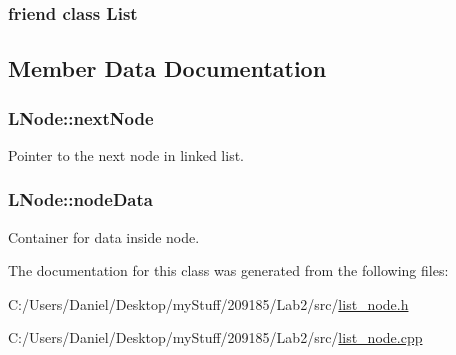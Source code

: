 \subsubsection[{List}]{\setlength{\rightskip}{0pt plus 5cm}friend class {\bf List}\hspace{0.3cm}{\ttfamily [friend]}}\label{class_l_node_a8cee552d09eaeb60a09d95309a87b498}


\subsection{Member Data Documentation}
\hypertarget{class_l_node_a4c8c3667cfa6a78673b91fa6a5bb93e6}{}
\subsubsection[{next\+Node}]{\setlength{\rightskip}{0pt plus 5cm}L\+Node\+::next\+Node\hspace{0.3cm}{\ttfamily [private]}}\label{class_l_node_a4c8c3667cfa6a78673b91fa6a5bb93e6}
Pointer to the next node in linked list. \hypertarget{class_l_node_a97c342a895b9c19e6a279acfe2c5d05c}{}
\subsubsection[{node\+Data}]{\setlength{\rightskip}{0pt plus 5cm}L\+Node\+::node\+Data\hspace{0.3cm}{\ttfamily [private]}}\label{class_l_node_a97c342a895b9c19e6a279acfe2c5d05c}
Container for data inside node. 

The documentation for this class was generated from the following files\+:\begin{DoxyCompactItemize}
\item 
C\+:/\+Users/\+Daniel/\+Desktop/my\+Stuff/209185/\+Lab2/src/\hyperlink{list__node_8h}{list\+\_\+node.\+h}\item 
C\+:/\+Users/\+Daniel/\+Desktop/my\+Stuff/209185/\+Lab2/src/\hyperlink{list__node_8cpp}{list\+\_\+node.\+cpp}\end{DoxyCompactItemize}
